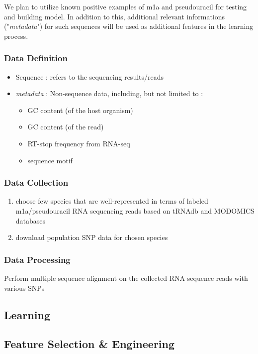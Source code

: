 \documentclass[paper=a4, fontsize=11pt]{scrartcl}
\numberwithin{equation}{section}    %
\numberwithin{figure}{section}      %
\numberwithin{table}{section}       %
\numberwithin{equation}{section}    %
\numberwithin{figure}{section}      %
\numberwithin{table}{section}       %
\begin{document}
We plan to utilize known positive examples of m1a and pseudouracil for testing and building model. In addition to this, additional relevant informations ("\textit{metadata}") for such sequences will be used as additional features in the learning process. 

\subsubsection{Data Definition}
\begin{itemize}
	\item Sequence : refers to the sequencing results/reads
	\item \textit{metadata} : Non-sequence data, including, but not limited to :
	\begin{itemize}
		\item GC content (of the host organism)
		\item GC content (of the read)
		\item RT-stop frequency from RNA-seq
		\item sequence motif
	\end{itemize}
\end{itemize}


\subsubsection{Data Collection}

\begin{enumerate}
	\item choose few species that are well-represented in terms of labeled m1a/pseudouracil RNA sequencing reads based on tRNAdb and MODOMICS databases
	\item download population SNP data for chosen species
\end{enumerate}

\subsubsection{Data Processing}
Perform multiple sequence alignment on the collected RNA sequence reads with various SNPs
	


\subsection{Learning}

\subsection{Feature Selection \& Engineering}
\end{document}
